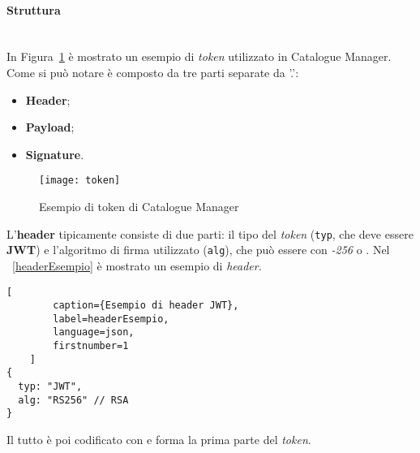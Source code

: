 \paragraph{Struttura} \mbox{} \\
In Figura~\ref{fig:token} è mostrato un esempio di \textit{token} utilizzato in Catalogue Manager. Come si può notare è composto da tre parti separate da '.':
\begin{itemize}
\item \textbf{Header};
\item \textbf{Payload};
\item \textbf{Signature}.
\end{itemize}

\begin{figure}[hbpc]
  \begin{center}
    \texttt{[image: token]}
  \caption[Esempio di token di Catalogue Manager]{Esempio di token di Catalogue Manager}
  \label{fig:token}
  \end{center} 
\end{figure}

L'\textbf{header} tipicamente consiste di due parti: il tipo del \textit{token} (\texttt{typ}, che deve essere \textbf{JWT}) e l'algoritmo di firma utilizzato (\texttt{alg}), che può essere  con \textit{-256} o . Nel \lstlistingname~\ref{headerEsempio} è mostrato un esempio di \textit{header}.
\begin{lstlisting}[
		caption={Esempio di header JWT},
		label=headerEsempio,
		language=json,
		firstnumber=1
	]
{
  typ: "JWT",
  alg: "RS256" // RSA
}
\end{lstlisting}
Il tutto è poi codificato con  e forma la prima parte del \textit{token}.

